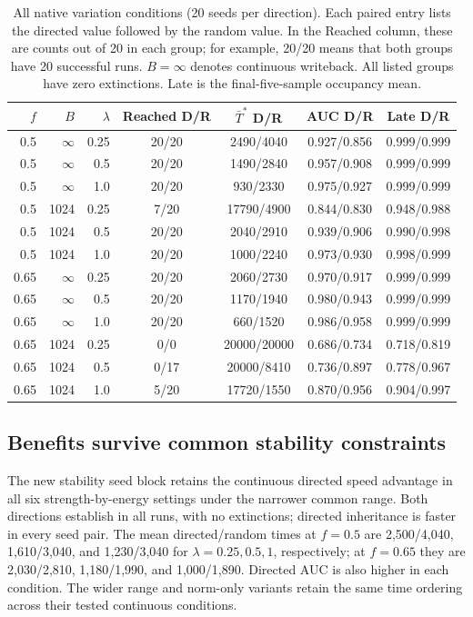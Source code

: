 \documentclass[11pt]{article}
\begin{document}
\begin{table}[htbp]\caption{All native variation conditions (20 seeds per direction). Each paired entry lists the directed value followed by the random value. In the Reached column, these are counts out of 20 in each group; for example, 20/20 means that both groups have 20 successful runs. $B=\infty$ denotes continuous writeback. All listed groups have zero extinctions. Late is the final-five-sample occupancy mean.}\label{tab:native}
\begin{center}
\small
\begin{tabular}{rrrcccc}
\toprule
$f$ & $B$ & $\lambda$ & Reached D/R & $\bar T^*$ D/R & AUC D/R & Late D/R \\
\midrule
0.5 & $\infty$ & 0.25 & 20/20 & 2490/4040 & 0.927/0.856 & 0.999/0.999 \\
0.5 & $\infty$ & 0.5 & 20/20 & 1490/2840 & 0.957/0.908 & 0.999/0.999 \\
0.5 & $\infty$ & 1.0 & 20/20 & 930/2330 & 0.975/0.927 & 0.999/0.999 \\
0.5 & 1024 & 0.25 & 7/20 & 17790/4900 & 0.844/0.830 & 0.948/0.988 \\
0.5 & 1024 & 0.5 & 20/20 & 2040/2910 & 0.939/0.906 & 0.990/0.998 \\
0.5 & 1024 & 1.0 & 20/20 & 1000/2240 & 0.973/0.930 & 0.998/0.999 \\
0.65 & $\infty$ & 0.25 & 20/20 & 2060/2730 & 0.970/0.917 & 0.999/0.999 \\
0.65 & $\infty$ & 0.5 & 20/20 & 1170/1940 & 0.980/0.943 & 0.999/0.999 \\
0.65 & $\infty$ & 1.0 & 20/20 & 660/1520 & 0.986/0.958 & 0.999/0.999 \\
0.65 & 1024 & 0.25 & 0/0 & 20000/20000 & 0.686/0.734 & 0.718/0.819 \\
0.65 & 1024 & 0.5 & 0/17 & 20000/8410 & 0.736/0.897 & 0.778/0.967 \\
0.65 & 1024 & 1.0 & 5/20 & 17720/1550 & 0.870/0.956 & 0.904/0.997 \\
\bottomrule
\end{tabular}
\end{center}
\end{table}

\subsection{Benefits survive common stability constraints}
The new stability seed block retains the continuous directed speed advantage in all six strength-by-energy settings under the narrower common range. Both directions establish in all runs, with no extinctions; directed inheritance is faster in every seed pair. The mean directed/random times at $f=0.5$ are 2,500/4,040, 1,610/3,040, and 1,230/3,040 for $\lambda=0.25,0.5,1$, respectively; at $f=0.65$ they are 2,030/2,810, 1,180/1,990, and 1,000/1,890. Directed AUC is also higher in each condition. The wider range and norm-only variants retain the same time ordering across their tested continuous conditions.
\end{document}
